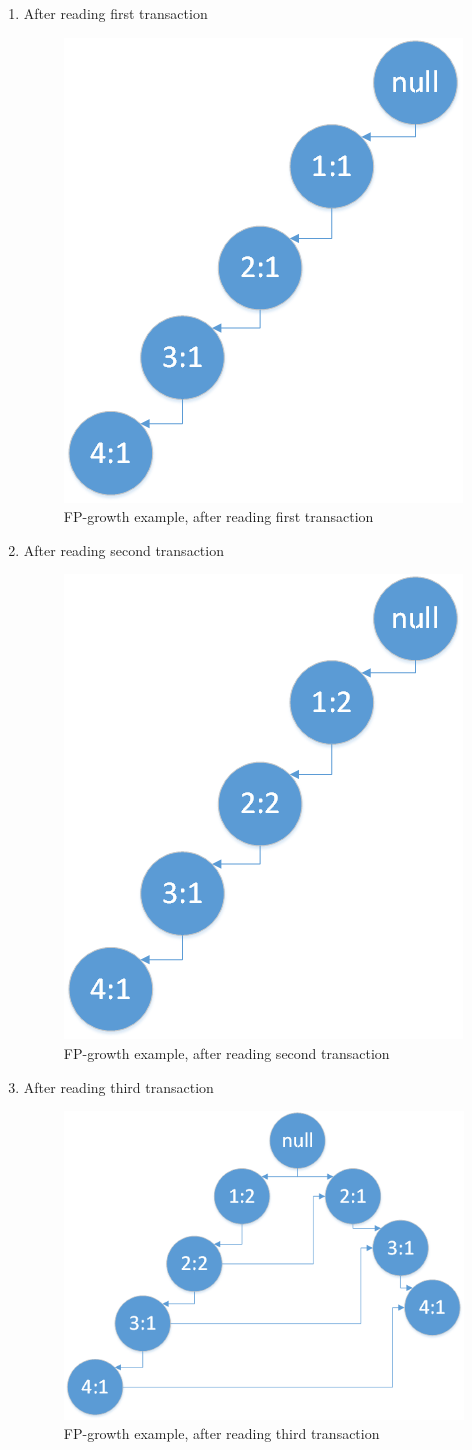 \begin{enumerate}
	\item After reading first transaction 
	\begin{figure}[H]
		\begin{center}
			\includegraphics[width=0.3\linewidth]{images/fp1.png}
			\caption{FP-growth example, after reading first transaction}
			\label{fp_1}
		\end{center}
	\end{figure}
	\item After reading second transaction 
		\begin{figure}[H]
			\begin{center}
				\includegraphics[width=0.3\linewidth]{images/fp2.png}
				\caption{FP-growth example, after reading second transaction}
				\label{fp_2}
			\end{center}
		\end{figure}
			\item After reading third transaction 
			\begin{figure}[H]
				\begin{center}
					\includegraphics[width=0.4\linewidth]{images/fp3.png}
					\caption{FP-growth example, after reading third transaction}

\end{center}
\end{figure}
\end{enumerate}
